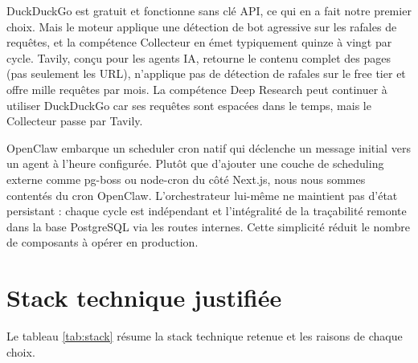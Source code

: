 \documentclass[12pt,a4paper,openany]{report}
\begin{document}
\begin{decisionBox}[title={Décision 4 : Tavily comme provider primaire de recherche web, DuckDuckGo en fallback}]
DuckDuckGo est gratuit et fonctionne sans clé API, ce qui en a fait notre premier choix. Mais le moteur applique une détection de bot agressive sur les rafales de requêtes, et la compétence Collecteur en émet typiquement quinze à vingt par cycle. Tavily, conçu pour les agents IA, retourne le contenu complet des pages (pas seulement les URL), n'applique pas de détection de rafales sur le free tier et offre mille requêtes par mois. La compétence Deep Research peut continuer à utiliser DuckDuckGo car ses requêtes sont espacées dans le temps, mais le Collecteur passe par Tavily.
\end{decisionBox}

\begin{decisionBox}[title=Décision 5 : cron OpenClaw natif et orchestrateur sans persistance propre]
OpenClaw embarque un scheduler cron natif qui déclenche un message initial vers un agent à l'heure configurée. Plutôt que d'ajouter une couche de scheduling externe comme pg-boss ou node-cron du côté Next.js, nous nous sommes contentés du cron OpenClaw. L'orchestrateur lui-même ne maintient pas d'état persistant : chaque cycle est indépendant et l'intégralité de la traçabilité remonte dans la base PostgreSQL via les routes internes. Cette simplicité réduit le nombre de composants à opérer en production.
\end{decisionBox}

\section{Stack technique justifiée}
\label{sec:stack-technique}

Le tableau \ref{tab:stack} résume la stack technique retenue et les raisons de chaque choix.
\end{document}
